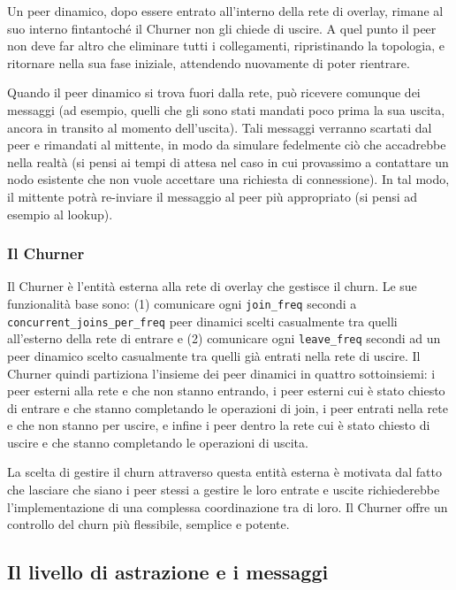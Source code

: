 \documentclass[prodmode,acmtap]{acmlarge}
\begin{document}
Un peer dinamico, dopo essere entrato all'interno della rete di overlay, rimane al suo interno fintantoché il Churner non gli chiede di uscire. A quel punto il peer non deve far altro che eliminare tutti i collegamenti, ripristinando la topologia, e ritornare nella sua fase iniziale, attendendo nuovamente di poter rientrare. 

Quando il peer dinamico si trova fuori dalla rete, può ricevere comunque dei messaggi (ad esempio, quelli che gli sono stati mandati poco prima la sua uscita, ancora in transito al momento dell'uscita). Tali messaggi verranno scartati dal peer e rimandati al mittente, in modo da simulare fedelmente ciò che accadrebbe nella realtà (si pensi ai tempi di attesa nel caso in cui provassimo a contattare un nodo esistente che non vuole accettare una richiesta di connessione). In tal modo, il mittente potrà re-inviare il messaggio al peer più appropriato (si pensi ad esempio al lookup).

\subsubsection*{Il Churner}
Il Churner è l'entità esterna alla rete di overlay che gestisce il churn. Le sue funzionalità base sono: (1) comunicare ogni \texttt{join\_freq} secondi a \texttt{concurrent\_joins\_per\_freq} peer dinamici scelti casualmente tra quelli all'esterno della rete di entrare e (2) comunicare ogni \texttt{leave\_freq} secondi ad un peer dinamico scelto casualmente tra quelli già entrati nella rete di uscire. Il Churner quindi partiziona l'insieme dei peer dinamici in quattro sottoinsiemi: i peer esterni alla rete e che non stanno entrando, i peer esterni cui è stato chiesto di entrare e che stanno completando le operazioni di join, i peer entrati nella rete e che non stanno per uscire, e infine i peer dentro la rete cui è stato chiesto di uscire e che stanno completando le operazioni di uscita.

La scelta di gestire il churn attraverso questa entità esterna è motivata dal fatto che lasciare che siano i peer stessi a gestire le loro entrate e uscite richiederebbe l'implementazione di una complessa coordinazione tra di loro. Il Churner offre un controllo del churn più flessibile, semplice e potente.


\subsection{Il livello di astrazione e i messaggi}
\end{document}
